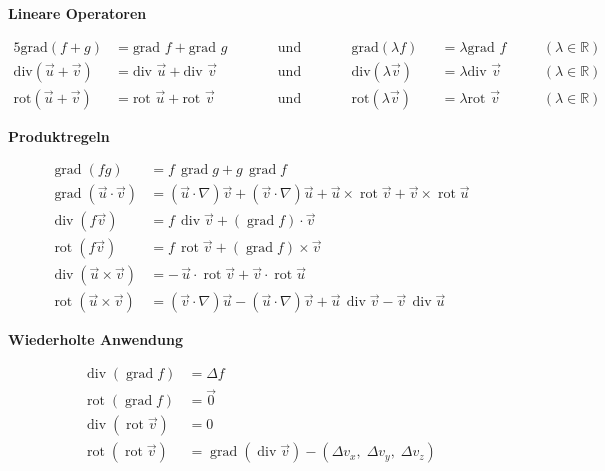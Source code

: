 \documentclass[a4paper,11pt,oneside,open=any,parskip=half, DIV=15]{scrreprt}
\begin{document}
   \textbf{Lineare Operatoren}
   \begin{importantbox}
      \begin{alignat*}{5}
         \text{grad}(f + g) &= \text{grad } f + \text{grad } g &&\qquad \text{und} \qquad&& \text{grad}(\lambda f) &&= \lambda \text{grad } f &&\quad (\lambda \in \mathbb{R}) \\
         \text{div}(\vec{u} + \vec{v}) &= \text{div } \vec{u} + \text{div } \vec{v} &&\qquad \text{und} \qquad&& \text{div}(\lambda \vec{v}) &&= \lambda \text{div } \vec{v} &&\quad (\lambda \in \mathbb{R})\\
         \text{rot}(\vec{u} + \vec{v}) &= \text{rot } \vec{u} + \text{rot } \vec{v} &&\qquad \text{und} \qquad&& \text{rot}(\lambda \vec{v}) &&= \lambda \text{rot } \vec{v} &&\quad (\lambda \in \mathbb{R})
      \end{alignat*}
   \end{importantbox}

   \textbf{Produktregeln}
   \begin{importantbox}
      \begin{align*}
         \operatorname{grad}(fg) &= f\,\operatorname{grad} g + g\,\operatorname{grad} f
         \\[1mm]
         \operatorname{grad}(\vec u\!\cdot\!\vec v)
         &= (\vec u\!\cdot\!\nabla)\vec v + (\vec v\!\cdot\!\nabla)\vec u
            + \vec u\times \operatorname{rot}\vec v + \vec v\times \operatorname{rot}\vec u\\[1mm]
         \operatorname{div}(f\vec v) &= f\,\operatorname{div}\vec v + (\operatorname{grad} f)\!\cdot\!\vec v
         \\
         \operatorname{rot}(f\vec v) &= f\,\operatorname{rot}\vec v + (\operatorname{grad} f)\times \vec v
         \\
         \operatorname{div}(\vec u\times \vec v)
         &= -\,\vec u\!\cdot\!\operatorname{rot}\vec v + \vec v\!\cdot\!\operatorname{rot}\vec u
         \\
         \operatorname{rot}(\vec u\times \vec v)
         &= (\vec v\!\cdot\!\nabla)\vec u - (\vec u\!\cdot\!\nabla)\vec v
            + \vec u\,\operatorname{div}\vec v - \vec v\,\operatorname{div}\vec u
      \end{align*}
   \end{importantbox}

   \textbf{Wiederholte Anwendung}

   \begin{importantbox}
      \begin{align*}
         \operatorname{div}(\operatorname{grad} f) &= \Delta f \\[1mm]
         \operatorname{rot}(\operatorname{grad} f) &= \vec 0 \\[1mm]
         \operatorname{div}(\operatorname{rot} \vec v) &= 0 \\[1mm]
         \operatorname{rot}(\operatorname{rot} \vec v) &= \operatorname{grad}(\operatorname{div} \vec v) - (\Delta v_x,\;\Delta v_y,\;\Delta v_z)
      \end{align*}
   \end{importantbox}
\end{document}
